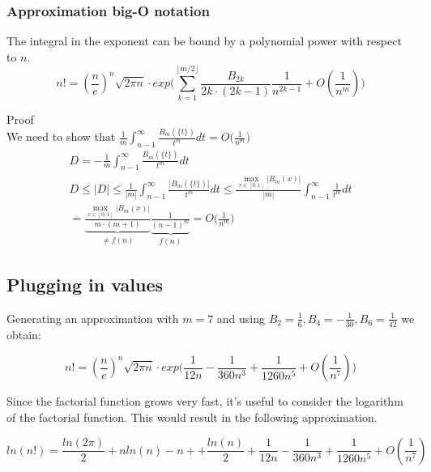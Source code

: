 \documentclass[a4paper]{article}
\begin{document}
\subsubsection{Approximation big-O notation}

\begin{theorem}
The integral in the exponent can be bound by a polynomial power with respect to $n$. 
\begin{equation}
\boxed{
n! = (\frac{n}{e})^n \sqrt{2\pi n} \cdot
exp \Big( \sum_{k=1}^{\lfloor m/2 \rfloor} \frac{B_{2k}}{2k \cdot (2k-1)} \frac{1}{n^{2k-1}} + O(\frac{1}{n^m}) \Big)
}
\end{equation}

Proof
\\
We  need to show that $\frac{1}{m} \int_{n-1}^{\infty} \frac{B_m(\{t\})}{t^m}  dt = O\Big( \frac{1}{n^m} \Big)$
\begin{gather*}
D = - \frac{1}{m} \int_{n-1}^{\infty} \frac{B_m(\{t\})}{t^m}  dt
\\
D \leq  |D| \leq \frac{1}{|m|} \int_{n-1}^{\infty} \frac{|B_m(\{t\})|}{t^m} dt \leq 
\frac{\max_{x \in [0,1]} |B_m(x)|}{|m|} \int_{n-1}^{\infty} \frac{1}{t^m}  dt
\\
=
\underbrace{\frac{\max_{x \in [0,1]} |B_m(x)|}{m\cdot (m+1)}}_{\neq f(n)}
\underbrace{\frac{1}{(n-1)^m}}_{f(n)}
= O \big( \frac{1}{n^m} \big)
\end{gather*}
\end{theorem}

\subsection{Plugging in values}
Generating an approximation with $m=7$ and using $B_2=\frac{1}{6}, B_4=-\frac{1}{30}, B_6=\frac{1}{42}$ we obtain:

\begin{equation}\label{n_factorial_approx}
n! = (\frac{n}{e})^n \sqrt{2\pi n} \cdot
exp \Big( \frac{1}{12 n} 
-
\frac{1}{360 n^{3}} 
+
\frac{1}{1260 n^{5}} 
+ O(\frac{1}{n^7}) \Big)
\end{equation}

Since the factorial function grows very fast, it's useful to consider the logarithm of the factorial function. This would result in the following approximation. 

\begin{equation}\label{log_n_factorial_approx}
ln(n!) = 
\frac{ln(2\pi)}{2} + 
n ln(n) - n +
+ \frac{ln(n)}{2}
+ \frac{1}{12 n} 
- \frac{1}{360 n^{3}} 
+ \frac{1}{1260 n^{5}} 
+ O(\frac{1}{n^7})
\end{equation}
\end{document}
